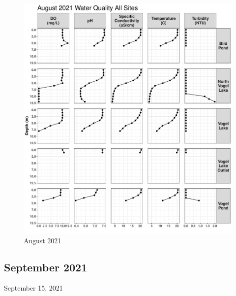 \documentclass[
]{book}
\begin{document}
\begin{figure}
\centering
\includegraphics{Miller_Creek_Vogel_Lake_Water_Quality_files/figure-latex/unnamed-chunk-8-1.pdf}
\caption{\label{fig:unnamed-chunk-8}August 2021}
\end{figure}

\hypertarget{september-2021}{%
\subsection{September 2021}\label{september-2021}}

September 15, 2021
\end{document}
